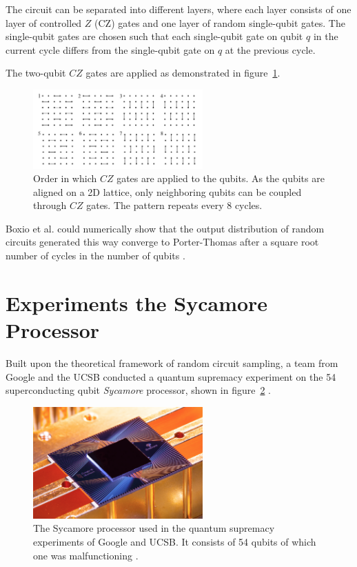 The circuit can be separated into different layers, where each layer consists of one
layer of controlled $Z$ (CZ) gates and one layer of random single-qubit gates. The single-qubit
gates are chosen such that each single-qubit gate on qubit $q$ in the current
cycle differs from the single-qubit gate on $q$ at the previous cycle.

The two-qubit $CZ$ gates are applied as demonstrated in figure~\ref{fig:czgates}.

\begin{figure}[H]
  \centering
  \label{fig:czgates}
  \includegraphics[width=0.58\textwidth]{figures/cz_order}
  \caption[Order of $CZ$ Gate Applications in Random Circuits]{Order in which $CZ$ gates are applied to the qubits. As 
  the qubits are aligned on a 2D lattice, only neighboring qubits can be coupled through $CZ$ gates. 
  The pattern repeats every 8 cycles.}
\end{figure}

Boxio et al. could numerically show that the output distribution of random circuits generated this way
converge to Porter-Thomas after a square root
number of cycles in the number of qubits \cite{Boixo2018supremacy}.

\section{Experiments the Sycamore Processor}

Built upon the theoretical framework of random circuit sampling,
a team from Google and the UCSB conducted a quantum
supremacy experiment on the 54 superconducting qubit \textit{Sycamore}
processor, shown in figure~\ref{fig:sycamore} \cite{martines2019supremacy}.

\begin{figure}[H]
  \centering
  \label{fig:sycamore}
  \includegraphics[width=0.58\textwidth]{figures/sycamore}
  \caption[The Sycamore processor]{The Sycamore processor used in the quantum supremacy experiments of Google and UCSB. It consists of 54 qubits of which one was malfunctioning \cite{martines2019supremacy}.}
\end{figure}

